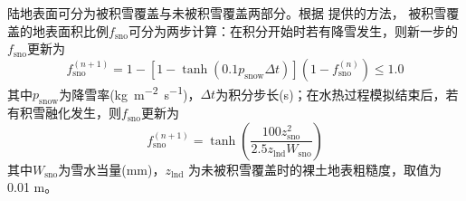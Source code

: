 陆地表面可分为被积雪覆盖与未被积雪覆盖两部分。根据 \citet{swenson2012new}提供的方法，
被积雪覆盖的地表面积比例$f_{\mathrm{sno}}$可分为两步计算：在积分开始时若有降雪发生，则新一步的$f_{\mathrm{sno}}$更新为
\begin{equation}
  f_{\mathrm{{sno }}}^{(n+1)}=1-\left[1-\tanh\left(0.1 p_{\mathrm{snow}} \Delta t\right)\right]\left(1-f_{\mathrm{{sno }}}^{(n)}\right) \leqslant 1.0
\end{equation}
其中$p_{\mathrm {snow}}$为降雪率(\unit{kg.m^{-2}.s^{-1}})，$\Delta t$为积分步长(s)；在水热过程模拟结束后，若有积雪融化发生，则$f_{\mathrm{sno}}$更新为
\begin{equation}
  f_{\mathrm{sno}}^{(n+1)}=\tanh{\left(\frac{100 z_{\mathrm{s n o}}^{2}}{2.5 z_{\mathrm{lnd}} W_{\mathrm{sno}}}\right)}
\end{equation}
其中$W_{\mathrm{sno}}$为雪水当量(mm)，$z_{\mathrm{lnd}}$ 为未被积雪覆盖时的裸土地表粗糙度，取值为0.01 m。


